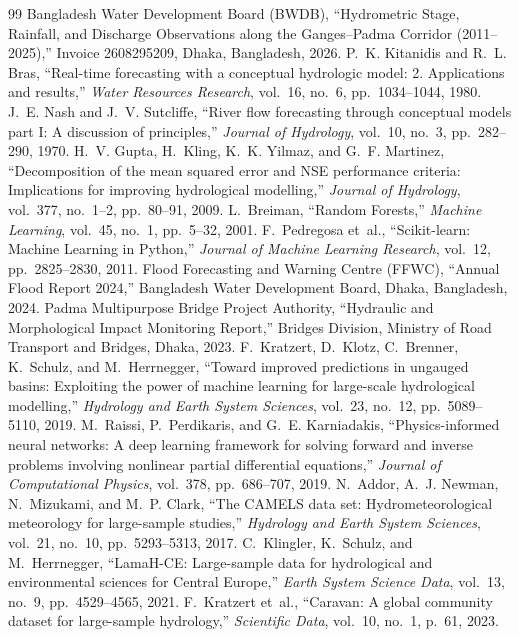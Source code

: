 \documentclass[11pt,a4paper]{article}
\begin{document}
\begin{thebibliography}{99}
   Bangladesh Water Development Board (BWDB), ``Hydrometric Stage, Rainfall, and Discharge Observations along the Ganges--Padma Corridor (2011--2025),'' Invoice 2608295209, Dhaka, Bangladesh, 2026.
   P.~K. Kitanidis and R.~L. Bras, ``Real-time forecasting with a conceptual hydrologic model: 2. Applications and results,'' \textit{Water Resources Research}, vol.~16, no.~6, pp.~1034--1044, 1980.
   J.~E. Nash and J.~V. Sutcliffe, ``River flow forecasting through conceptual models part I: A discussion of principles,'' \textit{Journal of Hydrology}, vol.~10, no.~3, pp.~282--290, 1970.
   H.~V. Gupta, H.~Kling, K.~K. Yilmaz, and G.~F. Martinez, ``Decomposition of the mean squared error and NSE performance criteria: Implications for improving hydrological modelling,'' \textit{Journal of Hydrology}, vol.~377, no.~1--2, pp.~80--91, 2009.
   L.~Breiman, ``Random Forests,'' \textit{Machine Learning}, vol.~45, no.~1, pp.~5--32, 2001.
   F.~Pedregosa et~al., ``Scikit-learn: Machine Learning in Python,'' \textit{Journal of Machine Learning Research}, vol.~12, pp.~2825--2830, 2011.
   Flood Forecasting and Warning Centre (FFWC), ``Annual Flood Report 2024,'' Bangladesh Water Development Board, Dhaka, Bangladesh, 2024.
   Padma Multipurpose Bridge Project Authority, ``Hydraulic and Morphological Impact Monitoring Report,'' Bridges Division, Ministry of Road Transport and Bridges, Dhaka, 2023.
   F.~Kratzert, D.~Klotz, C.~Brenner, K.~Schulz, and M.~Herrnegger, ``Toward improved predictions in ungauged basins: Exploiting the power of machine learning for large-scale hydrological modelling,'' \textit{Hydrology and Earth System Sciences}, vol.~23, no.~12, pp.~5089--5110, 2019.
   M.~Raissi, P.~Perdikaris, and G.~E. Karniadakis, ``Physics-informed neural networks: A deep learning framework for solving forward and inverse problems involving nonlinear partial differential equations,'' \textit{Journal of Computational Physics}, vol.~378, pp.~686--707, 2019.
   N.~Addor, A.~J. Newman, N.~Mizukami, and M.~P. Clark, ``The CAMELS data set: Hydrometeorological meteorology for large-sample studies,'' \textit{Hydrology and Earth System Sciences}, vol.~21, no.~10, pp.~5293--5313, 2017.
   C.~Klingler, K.~Schulz, and M.~Herrnegger, ``LamaH-CE: Large-sample data for hydrological and environmental sciences for Central Europe,'' \textit{Earth System Science Data}, vol.~13, no.~9, pp.~4529--4565, 2021.
   F.~Kratzert et~al., ``Caravan: A global community dataset for large-sample hydrology,'' \textit{Scientific Data}, vol.~10, no.~1, p.~61, 2023.
\end{thebibliography}
\end{document}
